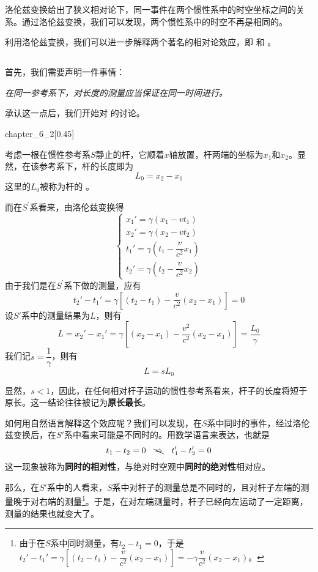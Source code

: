 洛伦兹变换给出了狭义相对论下，同一事件在两个惯性系中的时空坐标之间的关系。通过洛伦兹变换，我们可以发现，两个惯性系中的时空不再是相同的。

利用洛伦兹变换，我们可以进一步解释两个著名的相对论效应，即\linebreak{} 和 。
\subsection[尺缩效应]{}
首先，我们需要声明一件事情：
\begin{center}
    \em 在同一参考系下，对长度的测量应当保证在同一时间进行。
\end{center}
承认这一点后，我们开始对  的讨论。
\begin{singlefigure}{chapter_6_2}[0.45]
\end{singlefigure}
考虑一根在惯性参考系$S$静止的杆，它顺着$x$轴放置，杆两端的坐标为$x_1$和$x_2$。显然，在该参考系下，杆的长度即为$ $
\[L_0=x_2-x_1\]
这里的$L_0$被称为杆的 。

而在$S^{\prime}$系看来，由洛伦兹变换得
\[\left\{\begin{array}{l}
        x_{1}'=\gamma(x_1-vt_1)             \\
        x_{2}'=\gamma(x_2-vt_2)             \\
        t_1'=\gamma(t_1-\dfrac{v}{c^2} x_1) \\[1ex]
        t_2'=\gamma(t_2-\dfrac{v}{c^2} x_2)
    \end{array}\right.\]
由于我们是在$S^{\prime}$系下做的测量，应有
\[t_2'-t_1'=\gamma[(t_2-t_1)-\dfrac{v}{c^2} (x_2-x_1)]=0\]
设$S'$系中的测量结果为$L$，则有
\[L=x_2'-x_1'=\gamma[(x_2-x_1)-\dfrac{v^2}{c^2}(x_2-x_1)]=\dfrac{L_0}{\gamma}\]
我们记$s=\dfrac{1}{\gamma}$，则有
\begin{equation}
    L=sL_0
\end{equation}

显然，$s<1$，因此，在任何相对杆子运动的惯性参考系看来，杆子的长度将短于原长。这一结论往往被记为\textbf{原长最长}。

如何用自然语言解释这个效应呢？我们可以发现，在$S$系中同时的事件，经过洛伦兹变换后，在$S'$系中看来可能是不同时的。用数学语言来表达，也就是
\[
    t_1-t_2=0\quad \bcancel{\Rightarrow}\quad t_1'-t_2'=0
\]
这一现象被称为\textbf{同时的相对性}，与绝对时空观中\textbf{同时的绝对性}相对应。

那么，在$S'$系中的人看来，$S$系中对杆子的测量总是不同时的，且对杆子左端的测量晚于对右端的测量\footnote{由于在$S$系中同时测量，有$t_2-t_1=0$，于是$t_2'-t_1'=\gamma[(t_2-t_1)-\dfrac{v}{c^2} (x_2-x_1)]=-\gamma \dfrac{v}{c^2} (x_2-x_1)$。}。于是，在对左端测量时，杆子已经向左运动了一定距离，测量的结果也就变大了。

